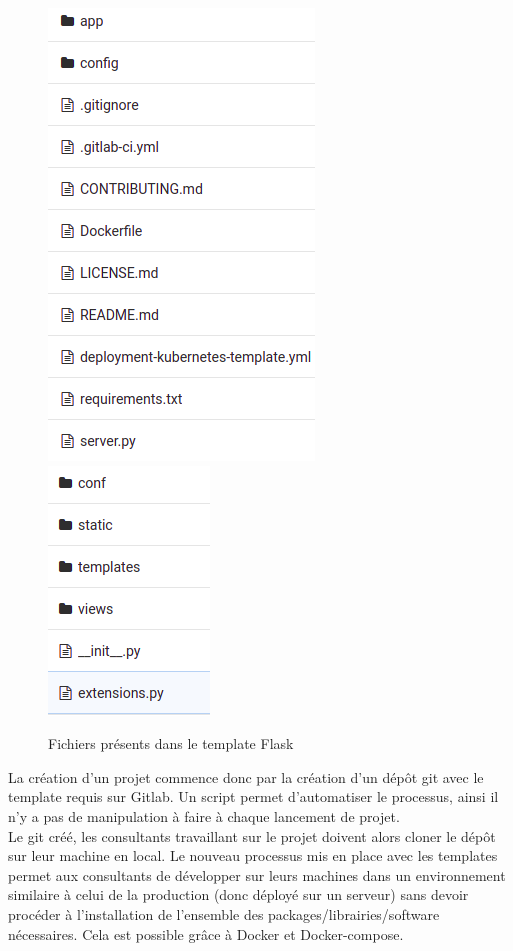 \documentclass{article} %
\begin{document}
{\begin{figure}[!h]
 \centering
 \includegraphics[keepaspectratio = true,scale=0.6]{confflask.png}
 \hspace{2cm}
 \includegraphics[keepaspectratio = true,scale=0.6]{cfla.png}
 \caption{Fichiers présents dans le template Flask}
 \label{fig:cfl}
\end{figure}

La création d'un projet commence donc par la création d'un dépôt git avec le template requis sur Gitlab. Un script permet d'automatiser le processus, ainsi il n'y a pas de manipulation à faire à chaque lancement de projet.\\

Le git créé, les consultants travaillant sur le projet doivent alors cloner le dépôt sur leur machine en local. Le nouveau processus mis en place avec les templates permet aux consultants de développer sur leurs machines dans un environnement similaire à celui de la production (donc déployé sur un serveur) sans devoir procéder à l'installation de l'ensemble des packages/librairies/software nécessaires. Cela est possible grâce à Docker et Docker-compose.\\

}
\end{document}
